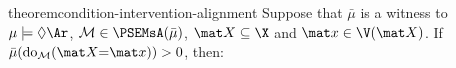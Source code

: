 \begin{linked}{theorem}{condition-intervention-alignment}
Suppose that
$\bar\mu$ is a witness to $\mu \models \Diamond \Ar$,
 $\mathcal M \in \PSEMsA(\bar\mu)$, $\mat X \subseteq \X$ and $\mat x \in \V(\mat X)$.
If $\bar\mu(\mathrm{do}_{\cal M}(\mat X{=}\mat x)) > 0$, then:

\end{linked}
